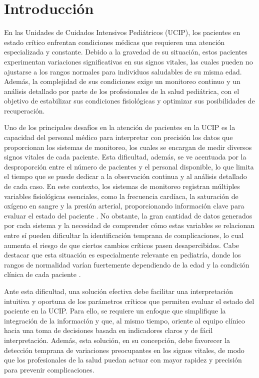 \chapter{Introducción}

En las Unidades de Cuidados Intensivos Pediátricos (UCIP), los pacientes en estado crítico enfrentan condiciones médicas que requieren una atención especializada y constante. Debido a la gravedad de su situación, estos pacientes experimentan variaciones significativas en sus signos vitales, las cuales pueden no ajustarse a los rangos normales para individuos saludables de su misma edad. Además, la complejidad de sus condiciones exige un monitoreo continuo y un análisis detallado por parte de los profesionales de la salud pediátrica, con el objetivo de estabilizar sus condiciones fisiológicas y optimizar sus posibilidades de recuperación.

Uno de los principales desafíos en la atención de pacientes en la UCIP es la capacidad del personal médico para interpretar con precisión los datos que proporcionan los sistemas de monitoreo, los cuales se encargan de medir diversos signos vitales de cada paciente. Esta dificultad, además, se ve acentuada por la desproporción entre el número de pacientes y el personal disponible, lo que limita el tiempo que se puede dedicar a la observación continua y al análisis detallado de cada caso. En este contexto, los sistemas de monitoreo registran múltiples variables fisiológicas esenciales, como la frecuencia cardíaca, la saturación de oxígeno en sangre y la presión arterial, proporcionando información clave para evaluar el estado del paciente \parencite{Areia2021}. No obstante, la gran cantidad de datos generados por cada sistema y la necesidad de comprender cómo estas variables se relacionan entre sí pueden dificultar la identificación temprana de complicaciones, lo cual aumenta el riesgo de que ciertos cambios críticos pasen desapercibidos. Cabe destacar que esta situación es especialmente relevante en pediatría, donde los rangos de normalidad varían fuertemente dependiendo de la edad y la condición clínica de cada paciente \parencite{Leyton2020}.

Ante esta dificultad, una solución efectiva debe facilitar una interpretación intuitiva y oportuna de los parámetros críticos que permiten evaluar el estado del paciente en la UCIP. Para ello, se requiere un enfoque que simplifique la integración de la información y que, al mismo tiempo, oriente al equipo clínico hacia una toma de decisiones basada en indicadores claros y de fácil interpretación. Además, esta solución, en su concepción, debe favorecer la detección temprana de variaciones preocupantes en los signos vitales, de modo que los profesionales de la salud puedan actuar con mayor rapidez y precisión para prevenir complicaciones.

